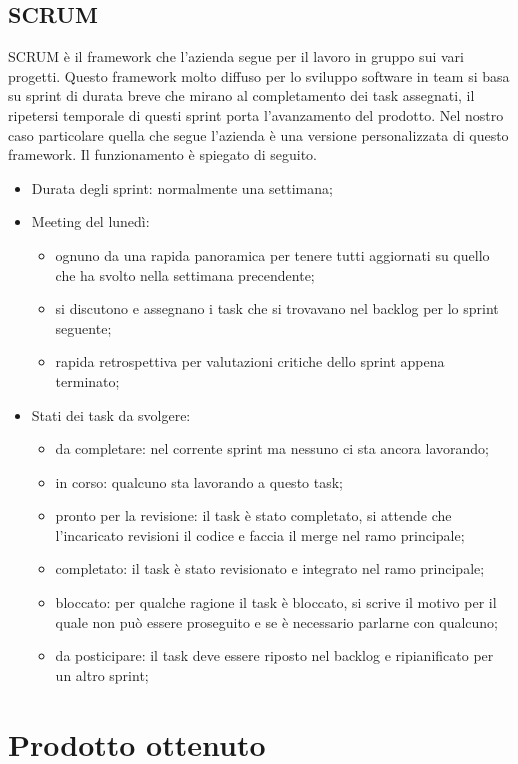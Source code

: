 \subsection*{SCRUM}
SCRUM è il framework che l'azienda segue per il lavoro in gruppo sui vari progetti. Questo framework molto diffuso per lo sviluppo software in
team si basa su sprint di durata breve che mirano al completamento dei task assegnati, il ripetersi temporale di questi sprint porta l'avanzamento
del prodotto. Nel nostro caso particolare quella che segue l'azienda è una versione personalizzata di questo framework. Il funzionamento è spiegato di seguito. \newline
\begin{itemize}
  \item Durata degli sprint: normalmente una settimana;
  \item Meeting del lunedì:
        \begin{itemize}
          \item ognuno da una rapida panoramica per tenere tutti aggiornati su quello che ha svolto nella settimana precendente;
          \item si discutono e assegnano i task che si trovavano nel backlog per lo sprint seguente;
          \item rapida retrospettiva per valutazioni critiche dello sprint appena terminato;
        \end{itemize}
  \item Stati dei task da svolgere:
        \begin{itemize}
          \item da completare: nel corrente sprint ma nessuno ci sta ancora lavorando;
          \item in corso: qualcuno sta lavorando a questo task;
          \item pronto per la revisione: il task è stato completato, si attende che l'incaricato revisioni il codice e faccia il merge nel ramo principale;
          \item completato: il task è stato revisionato e integrato nel ramo principale;
          \item bloccato: per qualche ragione il task è bloccato, si scrive il motivo per il quale non può essere proseguito e se è necessario parlarne con qualcuno;
          \item da posticipare: il task deve essere riposto nel backlog e ripianificato per un altro sprint;
        \end{itemize}
\end{itemize}

\section{Prodotto ottenuto}